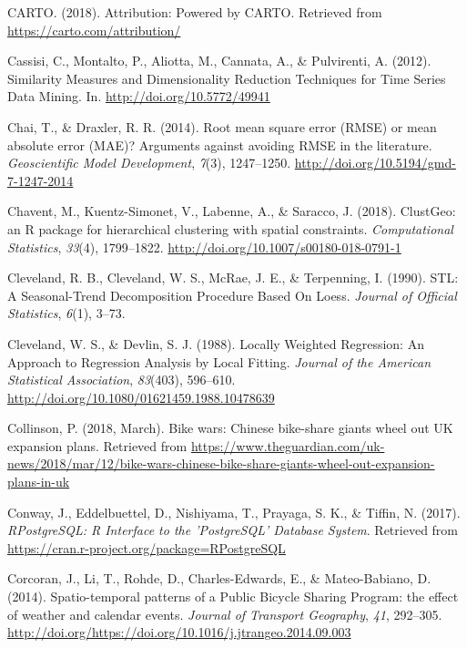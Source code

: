 \documentclass[12pt,oneside]{reedthesis}
\begin{document}
\hypertarget{ref-carto}{}
CARTO. (2018). Attribution: Powered by CARTO. Retrieved from
\url{https://carto.com/attribution/}

\hypertarget{ref-cassisi2012}{}
Cassisi, C., Montalto, P., Aliotta, M., Cannata, A., \& Pulvirenti, A.
(2012). Similarity Measures and Dimensionality Reduction Techniques for
Time Series Data Mining. In. \url{http://doi.org/10.5772/49941}

\hypertarget{ref-chai2014}{}
Chai, T., \& Draxler, R. R. (2014). Root mean square error (RMSE) or
mean absolute error (MAE)? Arguments against avoiding RMSE in the
literature. \emph{Geoscientific Model Development}, \emph{7}(3),
1247--1250. \url{http://doi.org/10.5194/gmd-7-1247-2014}

\hypertarget{ref-clustgeo}{}
Chavent, M., Kuentz-Simonet, V., Labenne, A., \& Saracco, J. (2018).
ClustGeo: an R package for hierarchical clustering with spatial
constraints. \emph{Computational Statistics}, \emph{33}(4), 1799--1822.
\url{http://doi.org/10.1007/s00180-018-0791-1}

\hypertarget{ref-cleveland1990}{}
Cleveland, R. B., Cleveland, W. S., McRae, J. E., \& Terpenning, I.
(1990). STL: A Seasonal-Trend Decomposition Procedure Based On Loess.
\emph{Journal of Official Statistics}, \emph{6}(1), 3--73.

\hypertarget{ref-cleveland1988}{}
Cleveland, W. S., \& Devlin, S. J. (1988). Locally Weighted Regression:
An Approach to Regression Analysis by Local Fitting. \emph{Journal of
the American Statistical Association}, \emph{83}(403), 596--610.
\url{http://doi.org/10.1080/01621459.1988.10478639}

\hypertarget{ref-guardian2}{}
Collinson, P. (2018, March). Bike wars: Chinese bike-share giants wheel
out UK expansion plans. Retrieved from
\url{https://www.theguardian.com/uk-news/2018/mar/12/bike-wars-chinese-bike-share-giants-wheel-out-expansion-plans-in-uk}

\hypertarget{ref-RPostgreSQL}{}
Conway, J., Eddelbuettel, D., Nishiyama, T., Prayaga, S. K., \& Tiffin,
N. (2017). \emph{RPostgreSQL: R Interface to the 'PostgreSQL' Database
System}. Retrieved from
\url{https://cran.r-project.org/package=RPostgreSQL}

\hypertarget{ref-corcoran2014}{}
Corcoran, J., Li, T., Rohde, D., Charles-Edwards, E., \& Mateo-Babiano,
D. (2014). Spatio-temporal patterns of a Public Bicycle Sharing Program:
the effect of weather and calendar events. \emph{Journal of Transport
Geography}, \emph{41}, 292--305.
\url{http://doi.org/https://doi.org/10.1016/j.jtrangeo.2014.09.003}
\end{document}
